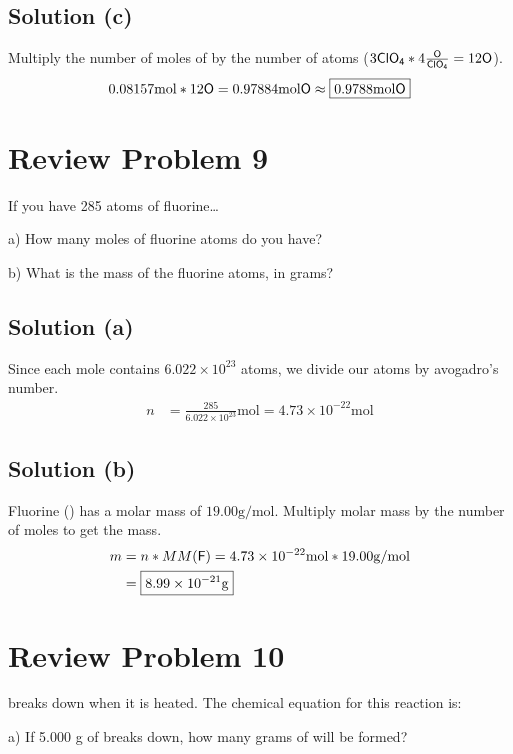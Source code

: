 \documentclass[10pt]{article}
\begin{document}
        \subsection{Solution (c)}
            Multiply the number of moles of  by the number of  atoms ($ 3 \ce{ClO4} * 4 \ce{\frac{O}{ClO4}} = 12 \ce{O} $).
            \begin{equation}
                0.08157 \unit{\mol} * 12 \ce{O} = 0.97884 \unit{\mol} \ce{O} \approx \boxed{0.9788 \unit{\mol} \ce{O}}
            \end{equation}
    
    \pagebreak
    \section{Review Problem 9}
        If you have 285 atoms of fluorine…
        
        a) How many moles of fluorine atoms do you have?
        
        b) What is the mass of the fluorine atoms, in grams?

        \subsection{Solution (a)}
            Since each mole contains $6.022 \times 10^{23}$ atoms, we divide our atoms by avogadro's number.
            \begin{align}
                n   &=  \frac{285}{6.022 \times 10^{23}} \unit{\mol}
                    =   \boxed{4.73 \times 10^{-22} \unit{\mol}}
            \end{align}

        \subsection{Solution (b)}
            Fluorine () has a molar mass of $19.00 \unit{\gram/\mol}$.
            Multiply molar mass by the number of moles to get the mass.
            \begin{align}
                m   &=  n * MM(\ce{F})
                    =   4.73 \times 10^{-22} \unit{\mol} * 19.00 \unit{\gram/\mol}\\
                    &=  \boxed{8.99 \times 10^{-21} \unit{\gram}}
            \end{align}

    \pagebreak
    \section{Review Problem 10}
         breaks down when it is heated. The chemical equation for this reaction is:
        \begin{center}
        \end{center}
        a) If 5.000 g of  breaks down, how many grams of  will be formed?
        
\end{document}

